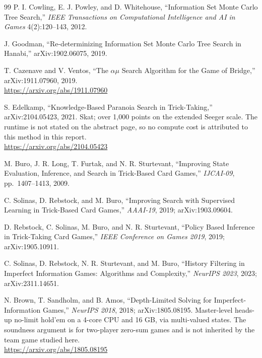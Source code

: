 \begin{thebibliography}{99}
P. I. Cowling, E. J. Powley, and D. Whitehouse, ``Information Set Monte Carlo
Tree Search,'' \emph{IEEE Transactions on Computational Intelligence and AI in
Games} 4(2):120--143, 2012.

J. Goodman, ``Re-determinizing Information Set Monte Carlo Tree Search in
Hanabi,'' arXiv:1902.06075, 2019.

T. Cazenave and V. Ventos, ``The $\alpha\mu$ Search Algorithm for the Game of
Bridge,'' arXiv:1911.07960, 2019.\\
\url{https://arxiv.org/abs/1911.07960}

S. Edelkamp, ``Knowledge-Based Paranoia Search in Trick-Taking,''
arXiv:2104.05423, 2021. Skat; over 1,000 points on the extended Seeger scale.
The runtime is not stated on the abstract page, so no compute cost is attributed
to this method in this report.\\
\url{https://arxiv.org/abs/2104.05423}

M. Buro, J. R. Long, T. Furtak, and N. R. Sturtevant, ``Improving State
Evaluation, Inference, and Search in Trick-Based Card Games,'' \emph{IJCAI-09},
pp.~1407--1413, 2009.

C. Solinas, D. Rebstock, and M. Buro, ``Improving Search with Supervised
Learning in Trick-Based Card Games,'' \emph{AAAI-19}, 2019; arXiv:1903.09604.

D. Rebstock, C. Solinas, M. Buro, and N. R. Sturtevant, ``Policy Based Inference
in Trick-Taking Card Games,'' \emph{IEEE Conference on Games 2019}, 2019;
arXiv:1905.10911.

C. Solinas, D. Rebstock, N. R. Sturtevant, and M. Buro, ``History Filtering in
Imperfect Information Games: Algorithms and Complexity,'' \emph{NeurIPS 2023},
2023; arXiv:2311.14651.


N. Brown, T. Sandholm, and B. Amos, ``Depth-Limited Solving for
Imperfect-Information Games,'' \emph{NeurIPS 2018}, 2018; arXiv:1805.08195.
Master-level heads-up no-limit hold'em on a 4-core CPU and 16 GB, via
multi-valued states. The soundness argument is for two-player zero-sum games and
is not inherited by the team game studied here.\\
\url{https://arxiv.org/abs/1805.08195}


\end{thebibliography}
